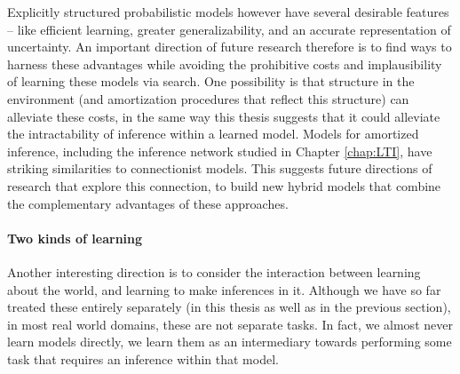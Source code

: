 Explicitly structured probabilistic models however have several desirable features -- like efficient learning\citep{kemp2007learning}, greater generalizability\citep{lake2017building}, and an accurate representation of uncertainty\citep{hacking2006emergence}. An important direction of future research therefore is to find ways to harness these advantages while avoiding the prohibitive costs and implausibility of learning these models via search. One possibility is that structure in the environment (and amortization procedures that reflect this structure) can alleviate these costs, in the same way this thesis suggests that it could alleviate the intractability of inference within a learned model. Models for amortized inference, including the inference network studied in Chapter \ref{chap:LTI}, have striking similarities to connectionist models. This suggests future directions of research that explore this connection, to build new hybrid models that combine the complementary advantages of these approaches.


\paragraph{Two kinds of learning}

Another interesting direction is to consider the interaction between learning about the world, and learning to make inferences in it. Although we have so far treated these entirely separately (in this thesis as well as in the previous section), in most real world domains, these are not separate tasks. In fact, we almost never learn models directly, we learn them as an intermediary towards performing some task that requires an inference within that model. 


